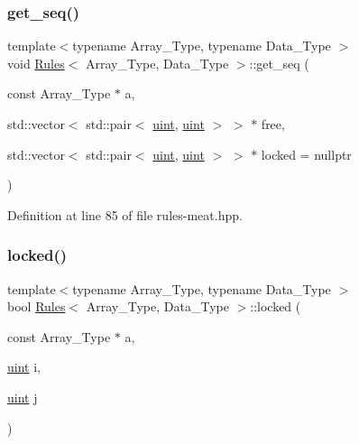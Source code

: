 \mbox{\label{class_rules_a7b8f29955ec52f49808d7ea1cd4eaf5e}} 
\subsubsection{\texorpdfstring{get\+\_\+seq()}{get\_seq()}}
{\footnotesize\ttfamily template$<$typename Array\+\_\+\+Type, typename Data\+\_\+\+Type $>$ \\
void \hyperlink{class_rules}{Rules}$<$ Array\+\_\+\+Type, Data\+\_\+\+Type $>$\+::get\+\_\+seq (\begin{DoxyParamCaption}\item[{const Array\+\_\+\+Type $\ast$}]{a,  }\item[{std\+::vector$<$ std\+::pair$<$ \hyperlink{typedefs_8hpp_a91ad9478d81a7aaf2593e8d9c3d06a14}{uint}, \hyperlink{typedefs_8hpp_a91ad9478d81a7aaf2593e8d9c3d06a14}{uint} $>$ $>$ $\ast$}]{free,  }\item[{std\+::vector$<$ std\+::pair$<$ \hyperlink{typedefs_8hpp_a91ad9478d81a7aaf2593e8d9c3d06a14}{uint}, \hyperlink{typedefs_8hpp_a91ad9478d81a7aaf2593e8d9c3d06a14}{uint} $>$ $>$ $\ast$}]{locked = {\ttfamily nullptr} }\end{DoxyParamCaption})\hspace{0.3cm}{\ttfamily [inline]}}



Definition at line 85 of file rules-\/meat.\+hpp.

\mbox{\label{class_rules_a4e08a6b3d8b536cb1717c62192a91537}} 
\subsubsection{\texorpdfstring{locked()}{locked()}}
{\footnotesize\ttfamily template$<$typename Array\+\_\+\+Type, typename Data\+\_\+\+Type $>$ \\
bool \hyperlink{class_rules}{Rules}$<$ Array\+\_\+\+Type, Data\+\_\+\+Type $>$\+::locked (\begin{DoxyParamCaption}\item[{const Array\+\_\+\+Type $\ast$}]{a,  }\item[{\hyperlink{typedefs_8hpp_a91ad9478d81a7aaf2593e8d9c3d06a14}{uint}}]{i,  }\item[{\hyperlink{typedefs_8hpp_a91ad9478d81a7aaf2593e8d9c3d06a14}{uint}}]{j }\end{DoxyParamCaption})\hspace{0.3cm}{\ttfamily [inline]}}



